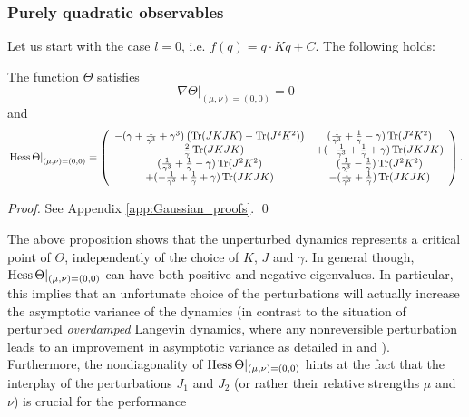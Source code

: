 \subsubsection{\label{sub:Purely-quadratic-observables}Purely quadratic observables}

Let us start with the case $l=0$, i.e. $f(q)=q\cdot Kq+C$. The following
holds: 
\begin{proposition}
	\label{thm: local quadratic observable}The function $\Theta$ satisfies
	\begin{equation}
	\left. \nabla\Theta\right\rvert_{(\mu,\nu)=(0,0)}=0\label{eq:gradTheta}
	\end{equation}
	and 
	\begin{equation}
	\left. \operatorname{Hess}\Theta\right\rvert_{(\mu,\nu)=(0,0)}=\left(\begin{array}{cc}
	-(\gamma+\frac{1}{\gamma^{3}}+\gamma^{3})\left(\operatorname{Tr}(JKJK)-\operatorname{Tr}(J^{2}K^{2})\right) & (\frac{1}{\gamma^{3}}+\frac{1}{\gamma}-\gamma)\operatorname{Tr}(J^{2}K^{2})\\
	-\frac{2}{\gamma}\operatorname{Tr}(JKJK) & +(-\frac{1}{\gamma^{3}}+\frac{1}{\gamma}+\gamma)\operatorname{Tr}(JKJK)\\
	(\frac{1}{\gamma^{3}}+\frac{1}{\gamma}-\gamma)\operatorname{Tr}(J^{2}K^{2}) & (\frac{1}{\gamma^{3}}-\frac{1}{\gamma})\operatorname{Tr}(J^{2}K^{2})\\
	+(-\frac{1}{\gamma^{3}}+\frac{1}{\gamma}+\gamma)\operatorname{Tr}(JKJK) & -(\frac{1}{\gamma^{3}}+\frac{1}{\gamma})\operatorname{Tr}(JKJK)
	\end{array}\right).\label{eq:HessTheta}
	\end{equation}
\end{proposition}
\begin{proof}
	See Appendix \ref{app:Gaussian_proofs}.
	\qed
\end{proof}
The above proposition shows that the unperturbed dynamics represents a
critical point of $\Theta$, independently of the choice of $K$,
$J$ and $\gamma$. In general though, $\operatorname{Hess}\Theta\vert_{(\mu,\nu)=(0,0)}$
can have both positive and negative eigenvalues. In particular, this
implies that an unfortunate choice of the perturbations will actually
increase the asymptotic variance of the dynamics (in contrast to the situation
of perturbed \emph{overdamped }Langevin dynamics, where any nonreversible
perturbation leads to an improvement in asymptotic variance as detailed
in \cite{asvar_Hwang} and \cite{duncan2016variance}). Furthermore, the nondiagonality
of $\operatorname{Hess}\Theta\vert_{(\mu,\nu)=(0,0)}$ hints at the fact that the
interplay of the perturbations $J_{1}$ and $J_{2}$ (or rather their
relative strengths $\mu$ and $\nu$) is crucial for the performance
